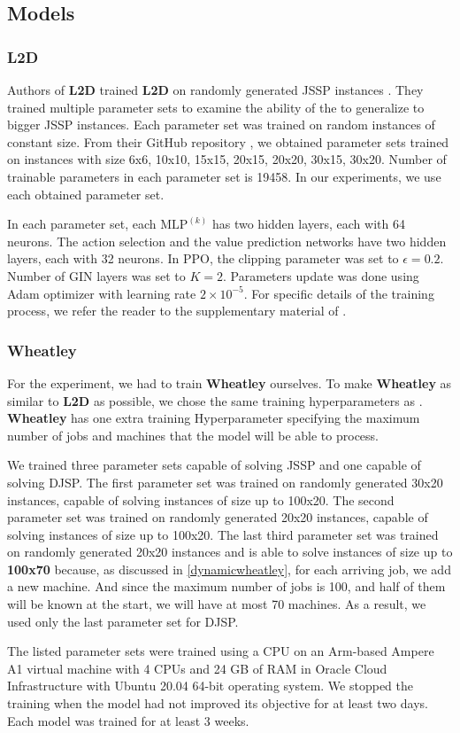 \subsection{Models}
\subsubsection{L2D}
Authors of \textbf{L2D} trained \textbf{L2D} on randomly generated JSSP instances \cite{zhang2020learning}. They trained multiple parameter sets to examine the ability of the  to generalize to bigger JSSP instances. Each parameter set was trained on random instances of constant size. From their GitHub repository \cite{github_l2d}, we obtained parameter sets trained on instances with size 6x6, 10x10, 15x15, 20x15, 20x20, 30x15, 30x20. Number of trainable parameters in each parameter set is 19458. In our experiments, we use each obtained parameter set. 
\par
In each parameter set, each $\text{MLP}^{(k)}$ has two hidden layers, each with 64 neurons. The action selection and the value prediction networks have two hidden layers, each with 32 neurons. In PPO, the clipping parameter was set to $\epsilon = 0.2$. Number of GIN layers was set to $K = 2$. Parameters update was done using Adam optimizer with learning rate $2\times10^{-5}$. For specific details of the training process, we refer the reader to the supplementary material of \cite{zhang2020learning}.

\subsubsection{Wheatley}
For the experiment, we had to train \textbf{Wheatley} ourselves. To make \textbf{Wheatley} as similar to \textbf{L2D} as possible, we chose the same training hyperparameters as . \textbf{Wheatley} has one extra training Hyperparameter specifying the maximum number of jobs and machines that the model will be able to process. 
\par
We trained three parameter sets capable of solving JSSP and one capable of solving DJSP. The first parameter set was trained on randomly generated 30x20 instances, capable of solving instances of size up to 100x20. The second parameter set was trained on randomly generated 20x20 instances, capable of solving instances of size up to 100x20. The last third parameter set was trained on randomly generated 20x20 instances and is able to solve instances of size up to \textbf{100x70} because, as discussed in \ref{dynamicwheatley}, for each arriving job, we add a new machine. And since the maximum number of jobs is 100, and half of them will be known at the start, we will have at most 70 machines. As a result, we used only the last parameter set for DJSP.
\par
The listed parameter sets were trained using a CPU on an Arm-based Ampere A1 virtual machine with 4 CPUs and 24 GB of RAM in Oracle Cloud Infrastructure with Ubuntu 20.04 64-bit operating system. We stopped the training when the model had not improved its objective for at least two days. Each model was trained for at least 3 weeks. 

